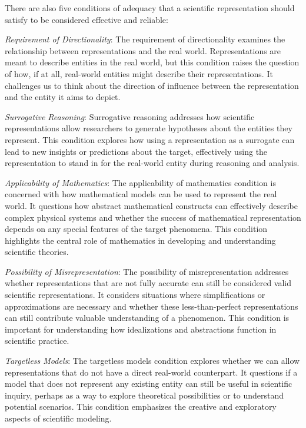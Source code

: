 There are also five conditions of adequacy that a scientific representation should satisfy to be considered effective and reliable:

\emph{Requirement of Directionality}: The requirement of directionality examines the relationship between representations and the real world. Representations are meant to describe entities in the real world, but this condition raises the question of how, if at all, real-world entities might describe their representations. It challenges us to think about the direction of influence between the representation and the entity it aims to depict.

\emph{Surrogative Reasoning}: Surrogative reasoning addresses how scientific representations allow researchers to generate hypotheses about the entities they represent. This condition explores how using a representation as a surrogate can lead to new insights or predictions about the target, effectively using the representation to stand in for the real-world entity during reasoning and analysis.

\emph{Applicability of Mathematics}: The applicability of mathematics condition is concerned with how mathematical models can be used to represent the real world. It questions how abstract mathematical constructs can effectively describe complex physical systems and whether the success of mathematical representation depends on any special features of the target phenomena. This condition highlights the central role of mathematics in developing and understanding scientific theories.

\emph{Possibility of Misrepresentation}: The possibility of misrepresentation addresses whether representations that are not fully accurate can still be considered valid scientific representations. It considers situations where simplifications or approximations are necessary and whether these less-than-perfect representations can still contribute valuable understanding of a phenomenon. This condition is important for understanding how idealizations and abstractions function in scientific practice.

\emph{Targetless Models}: The targetless models condition explores whether we can allow representations that do not have a direct real-world counterpart. It questions if a model that does not represent any existing entity can still be useful in scientific inquiry, perhaps as a way to explore theoretical possibilities or to understand potential scenarios. This condition emphasizes the creative and exploratory aspects of scientific modeling.

